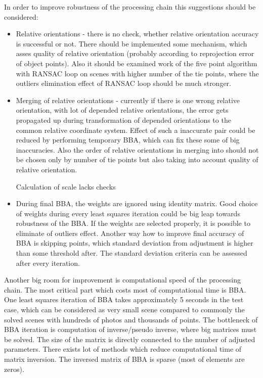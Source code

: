 \documentclass[a4paper,12pt]{article}
\begin{document}
In order to improve robustness of the processing chain this suggestions should be considered:
\begin{itemize}
\item Relative orientations - there is no check, whether relative orientation accuracy is successful or not. There 
should be implemented some mechanism, which asses quality of relative orientation (probably according to reprojection error of object points).
Also it should be examined work of the five point algorithm with RANSAC loop on scenes with higher number of the tie points, where 
the outliers elimination effect of RANSAC loop should be much stronger.
\item  Merging of relative orientations - currently if there is one wrong relative orientation, with lot of depended relative orientations,
the error gets propagated up during transformation of depended orientations to the common relative coordinate system. 
Effect of such a inaccurate pair could be 
reduced by performing  temporary BBA, which can fix these some of big inaccuracies. Also the order of relative orientations in merging 
into  should not 
be chosen only by number of tie points but also taking into account quality of relative orientation.

Calculation of scale lacks checks 

\item During final BBA, the weights are ignored using identity matrix. Good choice of weights during every least squares iteration 
could be big leap towards robustness of the BBA. If the weights are selected properly, it is possible to eliminate of outliers 
effect.
Another way how to improve final accuracy of BBA is skipping points, which 
standard deviation from adjustment is higher than some threshold after. The standard deviation criteria can be assessed 
after every iteration.
\end{itemize}


Another big room for improvement is computational speed of the processing chain.
The most critical part which costs most of computational time is BBA.
One least squares  iteration of BBA takes approximately 5 seconds in the test case, which can be 
considered as very small scene compared to commonly the solved
scenes with hundreds of photos and thousands of points. The bottleneck of BBA iteration is computation of inverse/pseudo inverse, where big matrices 
must be solved. The size of the matrix is directly connected to the number of adjusted parameters. There exists  lot of methods which reduce computational 
time of matrix inversion. The inversed matrix of BBA is sparse (most of elements are zeros).
\end{document}
